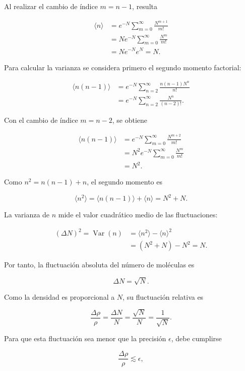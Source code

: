 Al realizar el cambio de índice $m=n-1$, resulta

$$
\begin{aligned}
\langle n\rangle
&=e^{-N}\sum_{m=0}^{\infty}\frac{N^{m+1}}{m!}\\
&=Ne^{-N}\sum_{m=0}^{\infty}\frac{N^m}{m!}\\
&=Ne^{-N}e^N=N.
\end{aligned}
$$

Para calcular la varianza se considera primero el segundo momento factorial:

$$
\begin{aligned}
\langle n(n-1)\rangle
&=e^{-N}\sum_{n=2}^{\infty}
\frac{n(n-1)N^n}{n!}\\
&=e^{-N}\sum_{n=2}^{\infty}\frac{N^n}{(n-2)!}.
\end{aligned}
$$

Con el cambio de índice $m=n-2$, se obtiene

$$
\begin{aligned}
\langle n(n-1)\rangle
&=e^{-N}\sum_{m=0}^{\infty}\frac{N^{m+2}}{m!}\\
&=N^2e^{-N}\sum_{m=0}^{\infty}\frac{N^m}{m!}\\
&=N^2.
\end{aligned}
$$

Como $n^2=n(n-1)+n$, el segundo momento es

$$
\langle n^2\rangle
=\langle n(n-1)\rangle+\langle n\rangle
=N^2+N.
$$

La varianza de $n$ mide el valor cuadrático medio de las fluctuaciones:

$$
\begin{aligned}
(\Delta N)^2
=\operatorname{Var}(n)
&=\langle n^2\rangle-\langle n\rangle^2\\
&=(N^2+N)-N^2=N.
\end{aligned}
$$

Por tanto, la fluctuación absoluta del número de moléculas es

$$
\boxed{\Delta N=\sqrt{N}}.
$$

Como la densidad es proporcional a $N$, su fluctuación relativa es

$$
\frac{\Delta\rho}{\rho}
=\frac{\Delta N}{N}
=\frac{\sqrt{N}}{N}
=\frac{1}{\sqrt{N}}.
$$

\figuraFluctuacionesDensidad

Para que esta fluctuación sea menor que la precisión $\epsilon$, debe
cumplirse

$$
\frac{\Delta\rho}{\rho}\lesssim\epsilon,
$$

